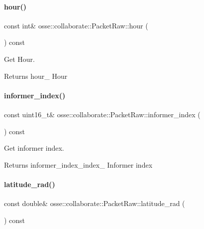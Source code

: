 \paragraph{\texorpdfstring{hour()}{hour()}}
{\footnotesize\ttfamily const int\& osse\+::collaborate\+::\+Packet\+Raw\+::hour (\begin{DoxyParamCaption}{ }\end{DoxyParamCaption}) const\hspace{0.3cm}{\ttfamily [inline]}}



Get Hour. 

\begin{DoxyReturn}{Returns}
hour\+\_\+ Hour 
\end{DoxyReturn}
\mbox{\label{classosse_1_1collaborate_1_1_packet_raw_ab0a721308e65ca879e2976b75c8f891c}} 
\paragraph{\texorpdfstring{informer\+\_\+index()}{informer\_index()}}
{\footnotesize\ttfamily const uint16\+\_\+t\& osse\+::collaborate\+::\+Packet\+Raw\+::informer\+\_\+index (\begin{DoxyParamCaption}{ }\end{DoxyParamCaption}) const\hspace{0.3cm}{\ttfamily [inline]}}



Get informer index. 

\begin{DoxyReturn}{Returns}
informer\+\_\+index\+\_\+index\+\_\+ Informer index 
\end{DoxyReturn}
\mbox{\label{classosse_1_1collaborate_1_1_packet_raw_ad5e2fab8d02a3a1219c7d9c0efeda5d3}} 
\paragraph{\texorpdfstring{latitude\+\_\+rad()}{latitude\_rad()}}
{\footnotesize\ttfamily const double\& osse\+::collaborate\+::\+Packet\+Raw\+::latitude\+\_\+rad (\begin{DoxyParamCaption}{ }\end{DoxyParamCaption}) const\hspace{0.3cm}{\ttfamily [inline]}}



